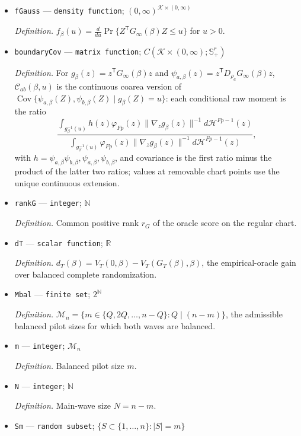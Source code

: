 \documentclass{article}
\begin{document}
\begin{itemize}
  \item \texttt{fGauss} --- \texttt{density function}; \((0,\infty)^{\mathcal K\times(0,\infty)}\)
  \par\smallskip\noindent\emph{Definition.} \(f_{\beta}(u)=\frac{d}{du}\Pr\{Z^{\mathsf T}G_{\infty}(\beta)Z\le u\}\) for \(u>0\).
  \item \texttt{boundaryCov} --- \texttt{matrix function}; \(C(\mathcal K\times(0,\infty);\mathbb S_{+}^{r})\)
  \par\smallskip\noindent\emph{Definition.} For \(g_{\beta}(z)=z^{\mathsf T}G_{\infty}(\beta)z\) and \(\psi_{a,\beta}(z)=z^{\mathsf T}D_{\rho_a}G_{\infty}(\beta)z\), \(\mathcal C_{ab}(\beta,u)\) is the continuous coarea version of \(\operatorname{Cov}\{\psi_{a,\beta}(Z),\psi_{b,\beta}(Z)\mid g_{\beta}(Z)=u\}\): each conditional raw moment is the ratio \[\frac{\int_{g_{\beta}^{-1}(u)}h(z)\varphi_{Fp}(z)\lVert\nabla_z g_{\beta}(z)\rVert^{-1}d\mathcal H^{Fp-1}(z)}{\int_{g_{\beta}^{-1}(u)}\varphi_{Fp}(z)\lVert\nabla_z g_{\beta}(z)\rVert^{-1}d\mathcal H^{Fp-1}(z)},\] with \(h=\psi_{a,\beta}\psi_{b,\beta},\psi_{a,\beta},\psi_{b,\beta}\), and covariance is the first ratio minus the product of the latter two ratios; values at removable chart points use the unique continuous extension.
  \item \texttt{rankG} --- \texttt{integer}; \(\mathbb N\)
  \par\smallskip\noindent\emph{Definition.} Common positive rank \(r_G\) of the oracle score on the regular chart.
  \item \texttt{dT} --- \texttt{scalar function}; \(\mathbb R\)
  \par\smallskip\noindent\emph{Definition.} \(d_T(\beta)=V_T(0,\beta)-V_T(G_T(\beta),\beta)\), the empirical-oracle gain over balanced complete randomization.
  \item \texttt{Mbal} --- \texttt{finite set}; \(2^{\mathbb N}\)
  \par\smallskip\noindent\emph{Definition.} \(\mathcal M_n=\{m\in\{Q,2Q,\ldots,n-Q\}:Q\mid(n-m)\}\), the admissible balanced pilot sizes for which both waves are balanced.
  \item \texttt{m} --- \texttt{integer}; \(\mathcal M_n\)
  \par\smallskip\noindent\emph{Definition.} Balanced pilot size \(m\).
  \item \texttt{N} --- \texttt{integer}; \(\mathbb N\)
  \par\smallskip\noindent\emph{Definition.} Main-wave size \(N=n-m\).
  \item \texttt{Sm} --- \texttt{random subset}; \(\{S\subset\{1,\ldots,n\}:|S|=m\}\)

\end{itemize}
\end{document}
